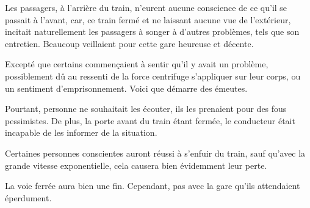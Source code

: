 \documentclass[]{cls/tools}
\begin{document}
Les passagers, à l'arrière du train, n'eurent aucune conscience de ce qu'il se passait à l'avant, car,
ce train fermé et ne laissant aucune vue de l'extérieur, incitait naturellement les passagers à songer à d'autres
problèmes, tels que son entretien. Beaucoup veillaient pour cette gare heureuse et décente.

Excepté que certains commençaient à sentir qu'il y avait un problème, possiblement dû au ressenti de la force centrifuge
s'appliquer sur leur corps, ou un sentiment d'emprisonnement. Voici que démarre des émeutes.

Pourtant, personne ne souhaitait les écouter, ils les prenaient pour des fous pessimistes. De plus, la porte avant du train 
étant fermée, le conducteur était incapable de les informer de la situation. 

Certaines personnes conscientes auront réussi à s'enfuir du train, sauf qu'avec la grande vitesse exponentielle, cela causera bien évidemment leur perte.

La voie ferrée aura bien une fin. Cependant, pas avec la gare qu'ils attendaient éperdument.
\end{document}
